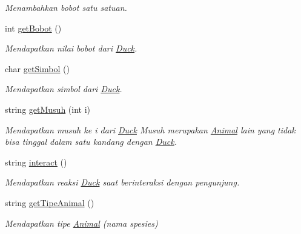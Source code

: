 \begin{DoxyCompactItemize}
\begin{DoxyCompactList}\small\item\em Menambahkan bobot satu satuan. \end{DoxyCompactList}\item 
int \hyperlink{classDuck_a21b1a913746b22e7cc50f00821605cf2}{get\-Bobot} ()
\begin{DoxyCompactList}\small\item\em Mendapatkan nilai bobot dari \hyperlink{classDuck}{Duck}. \end{DoxyCompactList}\item 
char \hyperlink{classDuck_a96b13b494232f7d4bffbce7eec321d87}{get\-Simbol} ()
\begin{DoxyCompactList}\small\item\em Mendapatkan simbol dari \hyperlink{classDuck}{Duck}. \end{DoxyCompactList}\item 
string \hyperlink{classDuck_a2b3f2c06edc5558de242bb3df9564525}{get\-Musuh} (int i)
\begin{DoxyCompactList}\small\item\em Mendapatkan musuh ke i dari \hyperlink{classDuck}{Duck} Musuh merupakan \hyperlink{classAnimal}{Animal} lain yang tidak bisa tinggal dalam satu kandang dengan \hyperlink{classDuck}{Duck}. \end{DoxyCompactList}\item 
string \hyperlink{classDuck_a2a8991eb931ec90eef13b9e4ead8f219}{interact} ()
\begin{DoxyCompactList}\small\item\em Mendapatkan reaksi \hyperlink{classDuck}{Duck} saat berinteraksi dengan pengunjung. \end{DoxyCompactList}\item 
string \hyperlink{classDuck_a9677d398bea572e67d908a0fe32bde9a}{get\-Tipe\-Animal} ()
\begin{DoxyCompactList}\small\item\em Mendapatkan tipe \hyperlink{classAnimal}{Animal} (nama spesies) \end{DoxyCompactList}\end{DoxyCompactItemize}
